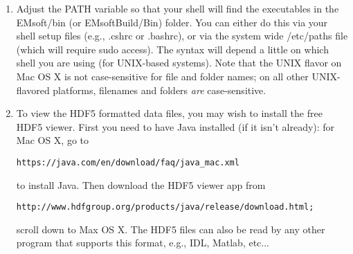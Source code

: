 \documentclass[DIV=calc, paper=letter, fontsize=11pt]{scrartcl}	 %
\begin{document}
\begin{enumerate}
\item Adjust the PATH variable so that your shell will find the executables in the \textsf{EMsoft/bin} (or \textsf{EMsoftBuild/Bin}) folder.  
You can either do this via your shell setup files (e.g., \textsf{.cshrc}
or \textsf{.bashrc}), or via the system wide \textsf{/etc/paths} file (which will require \textsf{sudo} access).
The syntax will depend a little on which shell you are using (for UNIX-based systems).  Note that the UNIX flavor on Mac OS X 
is not case-sensitive for file and folder names; on all other UNIX-flavored platforms, filenames and folders \textit{are}
case-sensitive.

\item To view the HDF5 formatted data files, you may wish to install the free HDF5 viewer.  First you need to have Java installed (if it isn't already):
for Mac OS X, go to 
\begin{verbatim}
https://java.com/en/download/faq/java_mac.xml
\end{verbatim}
to install Java.  Then download the HDF5 viewer app from
\begin{verbatim}
http://www.hdfgroup.org/products/java/release/download.html;
\end{verbatim}
scroll down to Max OS X.
The HDF5 files can also be read by any other program that supports this format, e.g., IDL, Matlab, etc...
\end{enumerate}


\newpage
\end{document}
